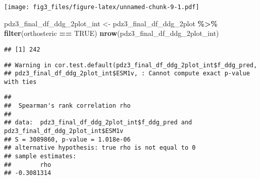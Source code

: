 \documentclass[
]{article}
\newenvironment{Shaded}{\begin{snugshade}}{\end{snugshade}}
\newcommand{\AttributeTok}[1]{\textcolor[rgb]{0.13,0.29,0.53}{#1}}
\newcommand{\CommentTok}[1]{\textcolor[rgb]{0.56,0.35,0.01}{\textit{#1}}}
\newcommand{\ConstantTok}[1]{\textcolor[rgb]{0.56,0.35,0.01}{#1}}
\newcommand{\FunctionTok}[1]{\textcolor[rgb]{0.13,0.29,0.53}{\textbf{#1}}}
\newcommand{\NormalTok}[1]{#1}
\newcommand{\OtherTok}[1]{\textcolor[rgb]{0.56,0.35,0.01}{#1}}
\newcommand{\SpecialCharTok}[1]{\textcolor[rgb]{0.81,0.36,0.00}{\textbf{#1}}}
\newcommand{\StringTok}[1]{\textcolor[rgb]{0.31,0.60,0.02}{#1}}
\begin{document}
\texttt{[image: fig3\_files/figure-latex/unnamed-chunk-9-1.pdf]}

\begin{Shaded}
\begin{Highlighting}[]
\NormalTok{pdz3\_final\_df\_ddg\_2plot\_int }\OtherTok{\textless{}{-}}\NormalTok{ pdz3\_final\_df\_ddg\_2plot }\SpecialCharTok{\%\textgreater{}\%} \FunctionTok{filter}\NormalTok{(orthosteric }\SpecialCharTok{==} \ConstantTok{TRUE}\NormalTok{)}
\FunctionTok{nrow}\NormalTok{(pdz3\_final\_df\_ddg\_2plot\_int)}
\end{Highlighting}
\end{Shaded}

\begin{verbatim}
## [1] 242
\end{verbatim}

\begin{Shaded}
\end{Shaded}

\begin{verbatim}
## Warning in cor.test.default(pdz3_final_df_ddg_2plot_int$f_ddg_pred,
## pdz3_final_df_ddg_2plot_int$ESM1v, : Cannot compute exact p-value with ties
\end{verbatim}

\begin{verbatim}
## 
##  Spearman's rank correlation rho
## 
## data:  pdz3_final_df_ddg_2plot_int$f_ddg_pred and pdz3_final_df_ddg_2plot_int$ESM1v
## S = 3089860, p-value = 1.018e-06
## alternative hypothesis: true rho is not equal to 0
## sample estimates:
##        rho 
## -0.3081314
\end{verbatim}
\end{document}
